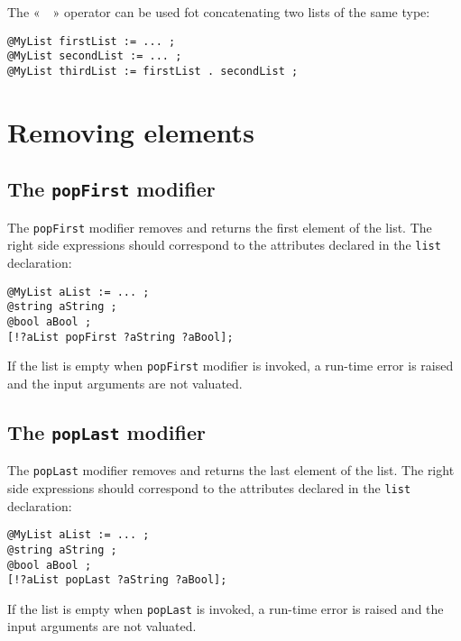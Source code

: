 The «~~» operator can be used fot concatenating two lists of the same type:


\begin{lstlisting}[language=galgas]
@MyList firstList := ... ;
@MyList secondList := ... ;
@MyList thirdList := firstList . secondList ;
\end{lstlisting}

\section{Removing elements}

\subsection{The \texttt{popFirst} modifier}


The \lstinline[language=galgas]!popFirst! modifier removes and returns the first element of the list. The right side expressions should correspond to the attributes declared in the \lstinline[language=galgas]!list! declaration:\\

\begin{lstlisting}[language=galgas]
@MyList aList := ... ;
@string aString ;
@bool aBool ;
[!?aList popFirst ?aString ?aBool];
\end{lstlisting}

If the list is empty when \lstinline[language=galgas]!popFirst! modifier is invoked, a run-time error is raised and the input arguments are not valuated.

\subsection{The \lstinline[language=galgas]!popLast! modifier}


The \lstinline[language=galgas]!popLast! modifier removes and returns the last element of the list. The right side expressions should correspond to the attributes declared in the \lstinline[language=galgas]!list! declaration:

\begin{lstlisting}[language=galgas]
@MyList aList := ... ;
@string aString ;
@bool aBool ;
[!?aList popLast ?aString ?aBool];
\end{lstlisting}

If the list is empty when \lstinline[language=galgas]!popLast! is invoked, a run-time error is raised and the input arguments are not valuated.

